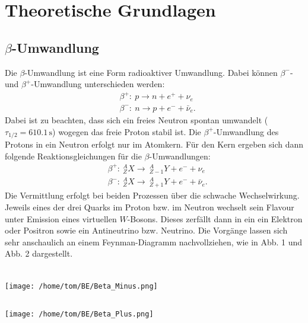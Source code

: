 \documentclass[german,  %
parskip=full,  %
]{scrartcl}
\begin{document}
\section{Theoretische Grundlagen}
\subsection{$\beta$-Umwandlung}
Die $\beta$-Umwandlung ist eine Form radioaktiver Umwandlung. Dabei können $\beta^-$- und $\beta^+$-Umwandlung unterschieden werden:
\begin{align*}
&\beta^+:\ p \rightarrow n + e^+ + \nu_e \\
&\beta^-:\ n \rightarrow p + e^- + \bar{\nu}_e.
\end{align*}
Dabei ist zu beachten, dass sich ein freies Neutron spontan umwandelt (\(\tau_{\mathrm{1/2}} = 610.1\,\mathrm{s}\)) wogegen das freie Proton stabil ist. Die \(\beta^{+}\)-Umwandlung des Protons in ein Neutron erfolgt nur im Atomkern. Für den Kern ergeben sich dann folgende Reaktionsgleichungen für die \(\beta\)-Umwandlungen:
\begin{align*}
&\beta^+:\ ^{A}_{Z}X \rightarrow \ ^{A}_{Z-1}Y + e^- + \nu_e \\
&\beta^-:\ ^{A}_{Z}X \rightarrow \ ^{A}_{Z+1}Y + e^- + \bar{\nu}_e.
\end{align*}
Die Vermittlung erfolgt bei beiden Prozessen über die schwache Wechselwirkung. Jeweils eines der drei Quarks im Proton bzw. im Neutron wechselt sein Flavour unter Emission eines virtuellen \(W\)-Bosons. Dieses zerfällt dann in ein ein Elektron oder Positron sowie ein Antineutrino bzw. Neutrino. Die Vorgänge lassen sich sehr anschaulich an einem Feynman-Diagramm nachvollziehen, wie in Abb. 1 und Abb. 2 dargestellt. \\\\
\begin{minipage}{0.48\textwidth}
\begin{flushleft}
\texttt{[image: /home/tom/BE/Beta\_Minus.png]}
\end{flushleft}
\end{minipage}
\begin{minipage}{0.04\textwidth}\centering
\[\ \ \]
\end{minipage}
\begin{minipage}{0.48\textwidth}
\begin{flushright}
\texttt{[image: /home/tom/BE/Beta\_Plus.png]}
\end{flushright}
\end{minipage} \\\\
\end{document}
